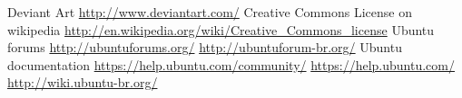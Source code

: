 \documentclass[xcolor={usenames,dvipsnames}]{beamer}
\newcommand{\sectiontitle}{}
\newcommand{\newsection}[1]{\renewcommand{\sectiontitle}{#1}\section{#1}}
\begin{document}
\begin{frame}[allowframebreaks]
\begin{thebibliography}{10}
            Deviant Art
            \newblock \url{http://www.deviantart.com/}
            Creative Commons License on wikipedia
            \newblock \url{http://en.wikipedia.org/wiki/Creative_Commons_license}
            Ubuntu forums
            \newblock \url{http://ubuntuforums.org/}
            \newblock \url{http://ubuntuforum-br.org/}
            Ubuntu documentation
            \newblock \url{https://help.ubuntu.com/community/}
            \newblock \url{https://help.ubuntu.com/}
            \newblock \url{http://wiki.ubuntu-br.org/}
    \end{thebibliography}
\end{frame}

%
%


\end{document}
